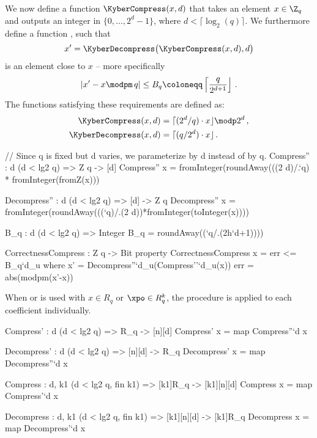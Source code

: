 We now define a function $\KyberCompress(x,d)$ that takes an element $x\in\Z_q$ and outputs an integer in $\{0,\dots,2^d-1\}$,
where $d<\lceil \log_2(q) \rceil$. We furthermore define a function \KyberDecompress, such that
\begin{equation}\label{eq:xprime}
x' = \KyberDecompress\big(\KyberCompress(x,d),d\big)
\end{equation}
is an element close to $x$ -- more specifically
\begin{equation}\label{eq:Bq} 
|x'-x\modpm\, q|\leq B_q\coloneqq \left\lceil \frac{q}{2^{d+1}}\right\rfloor\,.
\end{equation}
The functions satisfying these requirements are defined as:
\begin{align*}
  \KyberCompress(x,d)   &= \lceil (2^d/q)\cdot x \rfloor \modp 2^d\,,\\
  \KyberDecompress(x,d) &= \lceil (q/2^d)\cdot x \rfloor\,.
\end{align*}

\begin{code}
  // Since q is fixed but d varies, we parameterize by d instead of by q.
  Compress'' : {d} (d < lg2 q) => Z q -> [d]
  Compress'' x = fromInteger(roundAway(((2^^`d)/.`q) * fromInteger(fromZ(x))) %

  Decompress'' : {d} (d < lg2 q) => [d] -> Z q 
  Decompress'' x = fromInteger(roundAway(((`q)/.(2^^`d))*fromInteger(toInteger(x))))

  B_q : {d} (d < lg2 q) => Integer
  B_q = roundAway((`q/.(2^^(`d+1))))

  CorrectnessCompress : Z q -> Bit
  property CorrectnessCompress x = err <= B_q`{d_u} where
    x' = Decompress''`{d_u}(Compress''`{d_u}(x))
    err = abs(modpm(x'-x))
\end{code}

When \KyberCompress or \KyberDecompress is used with $x \in R_q$ or $\xpo \in R_q^k$, 
the procedure is applied to each coefficient individually.

\begin{code}
  Compress' : {d} (d < lg2 q) => R_q -> [n][d]
  Compress' x = map Compress''`{d} x
  
  Decompress' : {d} (d < lg2 q) => [n][d] -> R_q
  Decompress' x = map Decompress''`{d} x

  Compress : {d, k1} (d < lg2 q, fin k1) => [k1]R_q -> [k1][n][d]
  Compress x = map Compress'`{d} x
  
  Decompress : {d, k1} (d < lg2 q, fin k1) => [k1][n][d] -> [k1]R_q
  Decompress x = map Decompress'`{d} x
\end{code}

